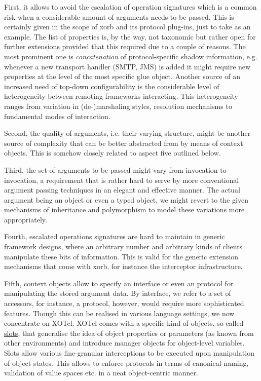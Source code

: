 First, it allows to avoid the escalation of operation signatures which is a common risk when a considerable amount of arguments needs to be passed. This is certainly given in the scope of xorb and its protocol plug-ins, just to take  as an example. The list of properties is, by the way, not taxonomic but rather open for further extensions provided that this required due to a couple of reasons. The most prominent one is \emph{concatenation} of protocol-specific shadow information, e.g. whenever a new transport handler (SMTP, JMS) is added it might require new properties at the level of the most specific glue object. Another source of an increased need of top-down configurability is the considerable level of heterogeneity between remoting frameworks interacting. This heterogeneity ranges from variation in (de-)marshaling styles, resolution mechanisms to fundamental modes of interaction.

Second, the quality of arguments, i.e. their varying structure, might be another source of complexity that can be better abstracted from by means of context objects. This is somehow closely related to aspect five outlined below.

Third, the set of arguments to be passed might vary from invocation to invocation, a requirement that is rather hard to serve by more conventional argument passing techniques in an elegant and effective manner. The actual argument being an object or even a typed object, we might revert to the given mechanisms of inheritance and polymorphism to model these variations more appropriately.

Fourth, escalated operations signatures are hard to maintain in generic framework designs, where an arbitrary number and arbitrary kinds of clients manipulate these bits of information. This is valid for the generic extension mechanisms that come with xorb, for instance the interceptor infrastructure.

Fifth, context objects allow to specify an interface or even an protocol for manipulating the stored argument data. By interface, we refer to a set of accessors, for instance, a protocol, however, would require more sophisticated features. Though this can be realised in various language settings, we now concentrate on XOTcl. XOTcl comes with a specific kind of objects, so called \href{http://media.wu-wien.ac.at/doc/tutorial.html#slots}{slots}, that generalise the idea of object properties or parameters (as known from other environments) and introduce manager objects for object-level variables. Slots allow various fine-granular interceptions to be executed upon manipulation of object states. This allows to enforce protocols in terms of canonical naming, validation of value spaces etc. in a neat object-centric manner.

